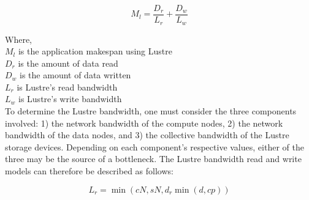 \documentclass[10pt,journal,compsoc]{IEEEtran}
\begin{document}
      \begin{equation}\label{eq:sea-comp:lustrenpc}
          M_{l} =  \frac{D_{r}}{L_{r}} + \frac{D_{w}}{L_{w}}
      \end{equation}

      {\noindent}
      Where, \\
      $M_{l}$ is the application makespan using Lustre \\
      $D_{r}$ is the amount of data read \\
      $D_{w}$ is the amount of data written \\
      $L_{r}$ is Lustre's read bandwidth \\
      $L_{w}$ is Lustre's write bandwidth \\



      To determine the Lustre bandwidth, one must consider the three components
  involved: 1) the network bandwidth of the compute nodes, 2) the network
  bandwidth of the data nodes, and 3) the collective bandwidth of the Lustre
  storage devices. Depending on each component's respective values, either of
  the three may be the source of a bottleneck. The Lustre bandwidth read and
  write models can therefore be described as follows:

    \begin{equation} %
        L_{r} = \min{(cN, sN, d_{r}\min{(d, cp)})}
    \end{equation}
\end{document}
